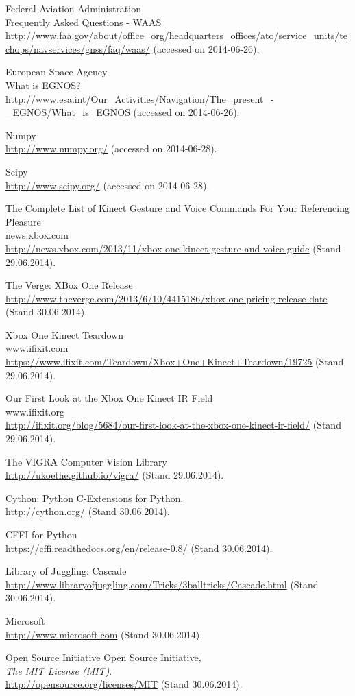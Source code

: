 \documentclass[12pt,a4paper,ngerman]{scrartcl}
\begin{document}
\begin{thebibliography}{99}
Federal Aviation Administration\\
Frequently Asked Questions - WAAS\\
\url{http://www.faa.gov/about/office_org/headquarters_offices/ato/service_units/techops/navservices/gnss/faq/waas/} (accessed on 2014-06-26).

European Space Agency\\
What is EGNOS?
\url{http://www.esa.int/Our_Activities/Navigation/The_present_-_EGNOS/What_is_EGNOS} (accessed on 2014-06-26).

Numpy\\
\url{http://www.numpy.org/} (accessed on 2014-06-28).

Scipy\\
\url{http://www.scipy.org/} (accessed on 2014-06-28).

The Complete List of Kinect Gesture and Voice Commands For Your Referencing Pleasure\\
news.xbox.com\\
\url{http://news.xbox.com/2013/11/xbox-one-kinect-gesture-and-voice-guide} (Stand 29.06.2014).

The Verge: XBox One Release\\
\url{http://www.theverge.com/2013/6/10/4415186/xbox-one-pricing-release-date} (Stand 30.06.2014).

Xbox One Kinect Teardown\\
www.ifixit.com\\
\url{https://www.ifixit.com/Teardown/Xbox+One+Kinect+Teardown/19725} (Stand 29.06.2014).

Our First Look at the Xbox One Kinect IR Field\\
www.ifixit.org\\
\url{http://ifixit.org/blog/5684/our-first-look-at-the-xbox-one-kinect-ir-field/} (Stand 29.06.2014).

The VIGRA Computer Vision Library\\
\url{http://ukoethe.github.io/vigra/} (Stand 29.06.2014).

Cython: Python C-Extensions for Python.\\
\url{http://cython.org/} (Stand 30.06.2014).

CFFI for Python\\
\url{https://cffi.readthedocs.org/en/release-0.8/} (Stand 30.06.2014).

Library of Juggling: Cascade\\
\url{http://www.libraryofjuggling.com/Tricks/3balltricks/Cascade.html} (Stand 30.06.2014).

Microsoft\\
\url{http://www.microsoft.com} (Stand 30.06.2014).

Open Source Initiative Open Source Initiative,\\
\emph{The MIT License (MIT)}.\\
\url{http://opensource.org/licenses/MIT} (Stand 30.06.2014).
\end{thebibliography}
\end{document}
